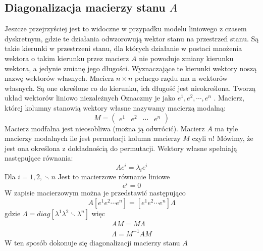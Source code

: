 \documentclass{article}
\begin{document}
		\subsection{Diagonalizacja macierzy stanu $A$}
			Jeszcze przejrzyściej jest to widoczne w przypadku modelu liniowego z czasem
			dyskretnym, gdzie te działania odwzorowują wektor stanu na przestrzeń stanu.
			Są takie kierunki w przestrzeni stanu, dla których działanie w postaci mnożenia wektora
			o takim kierunku przez macierz $A$ nie powoduje zmiany kierunku wektora, a jedynie
			zmianę jego długości. Wyznaczające te kierunki wektory noszą nazwę wektorów
			własnych. Macierz $n \times n$ pełnego rzędu ma n wektorów własnych. Są one określone co do
			kierunku, ich długość jest nieokreślona. Tworzą układ wektorów liniowo niezależnych
			Oznaczmy je jako $e^1, e^2, \cdots ,e^n$ .
			Macierz, której kolumny stanowią wektory własne nazywamy
			macierzą modalną:
			\begin{equation}
				M = 
				\begin{pmatrix}
					e^1 & e^2 & \cdots & e^n
				\end{pmatrix}
			\end{equation}
			Macierz modfalna jest nieosobliwa (można ją odwrócić). Macierz $A$ ma tyle macierzy
			modalnych ile jest permutacji kolumn macierzy $M$ czyli $n!$ Mówimy, że jest ona określona
			z dokładnością do permutacji.
			Wektory własne spełniają następujące równania:
			\begin{equation}
				Ae^i = \lambda_i e^i
			\end{equation}
			Dla $i= 1,2,\ddots n$
			Jest to macierzowe równanie liniowe
			\begin{equation}
				[A_i-\lambda_iI]e^i = 0
			\end{equation}
			W zapisie macierzowym można je przedstawić następująco
			\begin{equation}
				A [ e^1 e^2  \cdots  e^n ] = [ e^1  e^2  \cdots  e^n ] \Lambda
			\end{equation}
			gdzie $\Lambda = diag[ \lambda^1  \lambda^2 \ddots  \lambda^n ]$ więc
			\begin{align*}
				AM = M\Lambda \\ 
				\Lambda = M^{-1}AM
			\end{align*} 
			W ten sposób dokonuje się diagonalizacji macierzy stanu $A$
\end{document}
